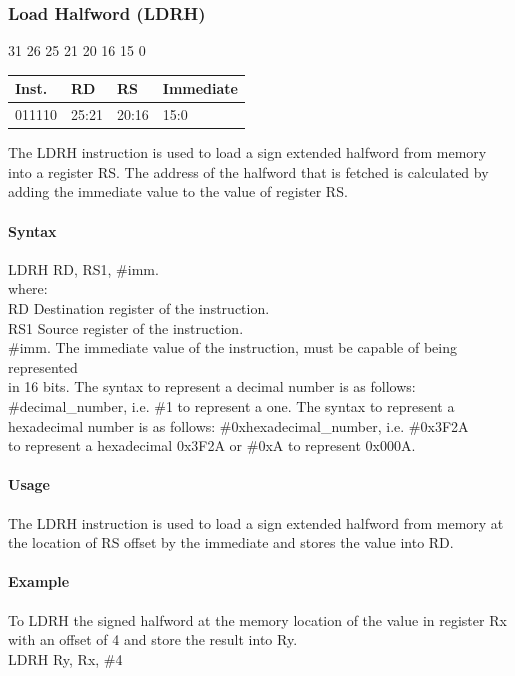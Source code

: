 \documentclass[12pt]{article}
\newcommand{\iTypeInstruction}[6]
{%
    \hspace{1.6cm}31 \hspace{1.15cm}26 \hspace{.05cm}25 \hspace{.8cm}21 \hspace{.05cm}20 \hspace{.8cm}16 \hspace{.05cm}15 \hspace{6.4cm}0
    \vspace{-.25cm}
    \begin{center}
        \begin{tabular}{ |p{1.8cm}|p{1.5cm}|p{1.5cm}|p{6.8cm}| }
            \hline
            \textbf{Inst.} & \textbf{RD} &  \textbf{RS} & \textbf{Immediate}\\
            \hline
            #1 & 25:21 & 20:16 &15:0\\
            \hline
        \end{tabular}
    \end{center}
    
    \noindent
    #2
    
    \paragraph{Syntax}
    \begin{flushleft}
    #3 RD, RS1, \#imm.\\
    \vspace{1em}        %
    where:\\
    \vspace{1em}
    RD  \hspace{3.6em} Destination register of the instruction.\\
    \vspace{1em}
    RS1  \hspace{3.35em} Source register of the instruction.\\
    \vspace{1em}
    \#imm.  \hspace{1.8em} The immediate value of the instruction, must be capable of being represented\\             \hspace{5.4em} in 16 bits. The syntax to represent a decimal number is as follows:\\
            \hspace{5.4em} \#decimal\_number, i.e. \#1 to represent a one. The syntax to represent a\\
            \hspace{5.4em} hexadecimal number is as follows: \#0xhexadecimal\_number, i.e. \#0x3F2A \\
            \hspace{5.4em} to represent a hexadecimal 0x3F2A or \#0xA to represent 0x000A.\\
    \end{flushleft}
    
    \paragraph{Usage}
    \begin{flushleft}
    #4\\
    \end{flushleft}
    \paragraph{Example}
    \begin{flushleft}
    #5\\
    \vspace{1em}
    #6
    \end{flushleft}}
\begin{document}

    \newpage
    \subsubsection{Load Halfword (LDRH)}
    
    \iTypeInstruction
    {011110}
    {The LDRH instruction is used to load a sign extended halfword from memory into a register RS. The address of the halfword that is fetched is calculated by adding the immediate value to the value of register RS.}
    {LDRH}
    {The LDRH instruction is used to load a sign extended halfword from memory at the location of RS offset by the immediate and stores the value into RD.}
    {To LDRH the signed halfword at the memory location of the value in register Rx with an offset of 4 and store the result into Ry.}
    {LDRH Ry, Rx, \#4}
    
    
    
\end{document}
